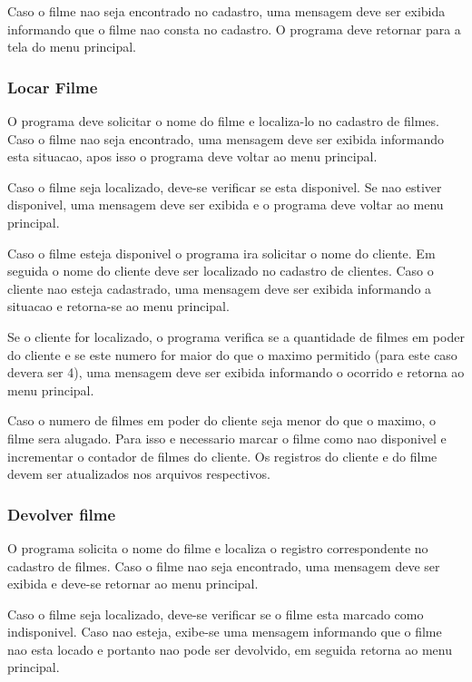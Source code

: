 \documentclass[a4paper,11pt]{article}
\begin{document}
Caso o filme nao seja encontrado no cadastro, uma mensagem deve ser exibida
informando que o filme nao consta no cadastro. O programa deve retornar para a
tela do menu principal.

\subsubsection{Locar Filme}

O programa deve solicitar o nome do filme e localiza-lo no cadastro de filmes.
Caso o filme nao seja encontrado, uma mensagem deve ser exibida informando esta
situacao, apos isso o programa deve voltar ao menu principal.

Caso o filme seja localizado, deve-se verificar se esta disponivel. Se nao
estiver disponivel, uma mensagem deve ser exibida e o programa deve voltar ao
menu principal.

Caso o filme esteja disponivel o programa ira solicitar o nome do cliente. Em
seguida o nome do cliente deve ser localizado no cadastro de clientes. Caso o
cliente nao esteja cadastrado, uma mensagem deve ser exibida informando a
situacao e retorna-se ao menu principal.

Se o cliente for localizado, o programa verifica se a quantidade de filmes em
poder do cliente e se este numero for maior do que o maximo permitido (para este
caso devera ser 4), uma mensagem deve ser exibida informando o ocorrido e
retorna ao menu principal.

Caso o numero de filmes em poder do cliente seja menor do que o maximo, o filme
sera alugado. Para isso e necessario marcar o filme como nao disponivel e
incrementar o contador de filmes do cliente. Os registros do cliente e do filme
devem ser atualizados nos arquivos respectivos.

\subsubsection{Devolver filme}

O programa solicita o nome do filme e localiza o registro correspondente no
cadastro de filmes. Caso o filme nao seja encontrado, uma mensagem deve ser
exibida e deve-se retornar ao menu principal.

Caso o filme seja localizado, deve-se verificar se o filme esta marcado como
indisponivel. Caso nao esteja, exibe-se uma mensagem informando que o filme nao
esta locado e portanto nao pode ser devolvido, em seguida retorna ao menu
principal.
\end{document}
